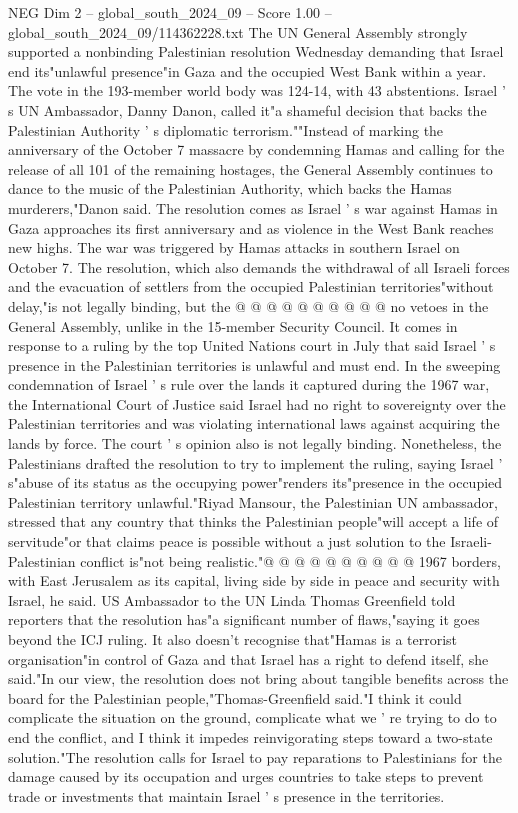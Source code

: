 \begin{textsample}{NEG Dim 2 – global\_south\_2024\_09 – Score 1.00 – global\_south\_2024\_09/114362228.txt}  \label{ex:f2_neg_256}
The UN General Assembly strongly supported a nonbinding Palestinian resolution Wednesday demanding that Israel end its"unlawful presence"in Gaza and the occupied West Bank within a year.
The vote in the 193-member world body was 124-14, with 43 abstentions.
Israel ' s UN Ambassador, Danny Danon, called it"a shameful decision that backs the Palestinian Authority ' s diplomatic terrorism.""Instead of marking the anniversary of the October 7 massacre by condemning Hamas and calling for the release of all 101 of the remaining hostages, the General Assembly continues to dance to the music of the Palestinian Authority, which backs the Hamas murderers,"Danon said.
The resolution comes as Israel ' s war against Hamas in Gaza approaches its first anniversary and as violence in the West Bank reaches new highs.
The war was triggered by Hamas attacks in southern Israel on October 7.
The resolution, which also demands the withdrawal of all Israeli forces and the evacuation of settlers from the occupied Palestinian territories"without delay,"is not legally binding, but the @ @ @ @ @ @ @ @ @ @ no vetoes in the General Assembly, unlike in the 15-member Security Council.
It comes in response to a ruling by the top United Nations court in July that said Israel ' s presence in the Palestinian territories is unlawful and must end.
In the sweeping condemnation of Israel ' s rule over the lands it captured during the 1967 war, the International Court of Justice said Israel had no right to sovereignty over the Palestinian territories and was violating international laws against acquiring the lands by force.
The court ' s opinion also is not legally binding.
Nonetheless, the Palestinians drafted the resolution to try to implement the ruling, saying Israel ' s"abuse of its status as the occupying power"renders its"presence in the occupied Palestinian territory unlawful."Riyad Mansour, the Palestinian UN ambassador, stressed that any country that thinks the Palestinian people"will accept a life of servitude"or that claims peace is possible without a just solution to the Israeli-Palestinian conflict is"not being realistic."@ @ @ @ @ @ @ @ @ @ 1967 borders, with East Jerusalem as its capital, living side by side in peace and security with Israel, he said.
US Ambassador to the UN Linda Thomas Greenfield told reporters that the resolution has"a significant number of flaws,"saying it goes beyond the ICJ ruling.
It also doesn't recognise that"Hamas is a terrorist organisation"in control of Gaza and that Israel has a right to defend itself, she said."In our view, the resolution does not bring about tangible benefits across the board for the Palestinian people,"Thomas-Greenfield said."I think it could complicate the situation on the ground, complicate what we ' re trying to do to end the conflict, and I think it impedes reinvigorating steps toward a two-state solution."The resolution calls for Israel to pay reparations to Palestinians for the damage caused by its occupation and urges countries to take steps to prevent trade or investments that maintain Israel ' s presence in the territories.

\end{textsample}
